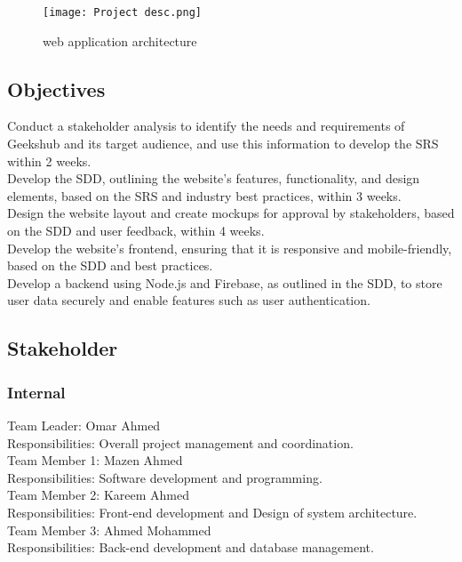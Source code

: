 \documentclass[hidelinks,a4paper,12pt]{article}
\begin{document}
\begin{figure}[h]
\centering
\texttt{[image: Project desc.png]}
\caption{web application architecture}
\label{fig:overview}
\end{figure}
\newpage

\subsection{Objectives}
Conduct a stakeholder analysis to identify the needs and requirements of Geekshub and its target audience, and use this information to develop the SRS within 2 weeks.\\

Develop the SDD, outlining the website's features, functionality, and design elements, based on the SRS and industry best practices, within 3 weeks.\\

Design the website layout and create mockups for approval by stakeholders, based on the SDD and user feedback, within 4 weeks.\\

Develop the website's frontend, ensuring that it is responsive and mobile-friendly, based on the SDD and best practices.\\

Develop a backend using Node.js and Firebase, as outlined in the SDD, to store user data securely and enable features such as user authentication.

\subsection{Stakeholder}
\subsubsection{Internal}
Team Leader: Omar Ahmed\\
Responsibilities: Overall project management and coordination.\\


Team Member 1: Mazen Ahmed\\
Responsibilities: Software development and programming.\\


Team Member 2: Kareem Ahmed\\
Responsibilities: Front-end development and   Design of system architecture.\\


Team Member 3: Ahmed Mohammed\\
Responsibilities: Back-end development and database management.\\
\end{document}
